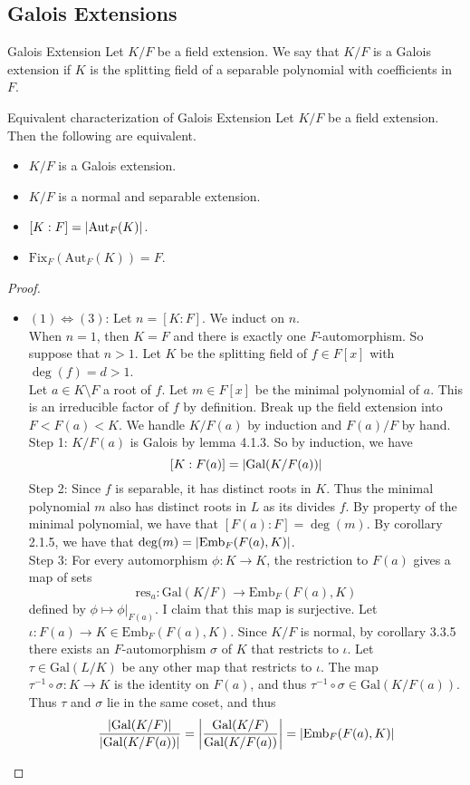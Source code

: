 \documentclass[a4paper]{article}
\begin{document}
\subsection{Galois Extensions}
\begin{defn}{Galois Extension}{} Let $K/F$ be a field extension. We say that $K/F$ is a Galois extension if $K$ is the splitting field of a separable polynomial with coefficients in $F$. 
\end{defn}

\begin{prp}{Equivalent characterization of Galois Extension}{} Let $K/F$ be a field extension. Then the following are equivalent. 
\begin{itemize}
\item $K/F$ is a Galois extension. 
\item $K/F$ is a normal and separable extension. 
\item $[K:F]=\abs{\text{Aut}_F(K)}$. 
\item $\text{Fix}_F(\text{Aut}_F(K))=F$. 
\end{itemize} 
\begin{proof}~\\
\begin{itemize}
\item $(1)\iff(3)$: Let $n=[K:F]$. We induct on $n$. \\
When $n=1$, then $K=F$ and there is exactly one $F$-automorphism. So suppose that $n>1$. Let $K$ be the splitting field of $f\in F[x]$ with $\deg(f)=d>1$. \\
Let $a\in K\setminus F$ a root of $f$. Let $m\in F[x]$ be the minimal polynomial of $a$. This is an irreducible factor of $f$ by definition. Break up the field extension into $F<F(a)<K$. We handle $K/F(a)$ by induction and $F(a)/F$ by hand. \\
Step 1: $K/F(a)$ is Galois by lemma 4.1.3. So by induction, we have $$[K:F(a)]=\abs{\text{Gal}(K/F(a))}$$
Step 2: Since $f$ is separable, it has distinct roots in $K$. Thus the minimal polynomial $m$ also has distinct roots in $L$ as its divides $f$. By property of the minimal polynomial, we have that $[F(a):F]=\deg(m)$. By corollary 2.1.5, we have that $\deg(m)=\abs{\text{Emb}_F(F(a),K)}$. \\
Step 3: For every automorphism $\phi:K\to K$, the restriction to $F(a)$ gives a map of sets $$\text{res}_a:\text{Gal}(K/F)\to\text{Emb}_F(F(a),K)$$ defined by $\phi\mapsto\phi|_{F(a)}$. I claim that this map is surjective. Let $\iota:F(a)\to K\in\text{Emb}_F(F(a),K)$. Since $K/F$ is normal, by corollary 3.3.5 there exists an $F$-automorphism $\sigma$ of $K$ that restricts to $\iota$. Let $\tau\in\text{Gal}(L/K)$ be any other map that restricts to $\iota$. The map $\tau^{-1}\circ\sigma:K\to K$ is the identity on $F(a)$, and thus $\tau^{-1}\circ\sigma\in\text{Gal}(K/F(a))$. Thus $\tau$ and $\sigma$ lie in the same coset, and thus $$\frac{\abs{\text{Gal}(K/F)}}{\abs{\text{Gal}(K/F(a))}}=\abs{\frac{\text{Gal}(K/F)}{\text{Gal}(K/F(a))}}=\abs{\text{Emb}_F(F(a),K)}$$

\end{itemize}
\end{proof}
\end{prp}
\end{document}
